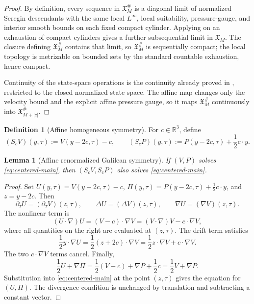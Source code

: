 \documentclass[11pt]{amsart}
\numberwithin{equation}{section}
\theoremstyle{plain}
\newtheorem{lemma}[theorem]{Lemma}
\theoremstyle{definition}
\newtheorem{definition}[theorem]{Definition}
\theoremstyle{remark}
\newcommand{\R}{\mathbb R}
\begin{document}
\begin{proof}
By definition, every sequence in \(\mathfrak X_M^\#\) is a diagonal limit of
normalized Seregin descendants with the same local \(L^\infty\), local
suitability, pressure-gauge, and interior smooth bounds on each fixed compact
cylinder.  Applying  on an exhaustion of
compact cylinders gives a further subsequential limit in \(\mathfrak X_M\).  The
closure defining \(\mathfrak X_M^\#\) contains that limit, so
\(\mathfrak X_M^\#\) is sequentially compact; the local topology is metrizable on
bounded sets by the standard countable exhaustion, hence compact.

Continuity of the state-space operations is the continuity already proved in
, restricted to the closed normalized
state space.  The affine map changes only the velocity bound and the explicit
affine pressure gauge, so it maps \(\mathfrak X_M^\#\) continuously into
\(\mathfrak X_{M+|c|}^\#\).
\end{proof}

\begin{definition}[Affine homogeneous symmetry]
\label{def:affine-symmetry}
For \(c\in\R^3\), define
\[
   (S_cV)(y,\tau):=V(y-2c,\tau)-c,
   \qquad
   (S_cP)(y,\tau):=P(y-2c,\tau)+\frac12 c\cdot y .
\]
\end{definition}

\begin{lemma}[Affine renormalized Galilean symmetry]
\label{lem:affine-symmetry}
If \((V,P)\) solves \eqref{eq:centered-main}, then
\((S_cV,S_cP)\) also solves \eqref{eq:centered-main}.
\end{lemma}

\begin{proof}
Set \(U(y,\tau)=V(y-2c,\tau)-c\),
\(\Pi(y,\tau)=P(y-2c,\tau)+\frac12c\cdot y\), and \(z=y-2c\).  Then
\[
   \partial_\tau U=(\partial_\tau V)(z,\tau),
   \qquad \Delta U=(\Delta V)(z,\tau),
   \qquad \nabla U=(\nabla V)(z,\tau).
\]
The nonlinear term is
\[
   (U\cdot\nabla)U=(V-c)\cdot\nabla V
   =(V\cdot\nabla)V-c\cdot\nabla V,
\]
where all quantities on the right are evaluated at \((z,\tau)\).  The drift
term satisfies
\[
   \frac12 y\cdot\nabla U
   =\frac12(z+2c)\cdot\nabla V
   =\frac12z\cdot\nabla V+c\cdot\nabla V.
\]
The two \(c\cdot\nabla V\) terms cancel.  Finally,
\[
   \frac12U+\nabla\Pi
   =
   \frac12(V-c)+\nabla P+\frac12c
   =
   \frac12V+\nabla P.
\]
Substitution into \eqref{eq:centered-main} at the point \((z,\tau)\) gives the
equation for \((U,\Pi)\).  The divergence condition is unchanged by translation
and subtracting a constant vector.
\end{proof}
\end{document}
